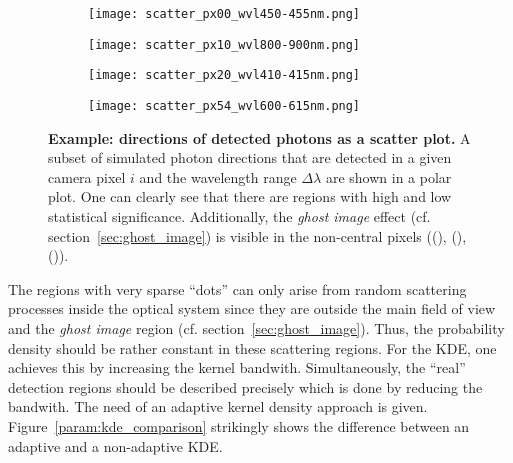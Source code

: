 \begin{figure}[H]
	\centering
	\begin{subfigure}[t]{0.49\textwidth}
		\texttt{[image: scatter\_px00\_wvl450-455nm.png]}
		\subcaption{}
		\label{param:example_scatter:1}
	\end{subfigure}
	\hfill
	\begin{subfigure}[t]{0.49\textwidth}
		\texttt{[image: scatter\_px10\_wvl800-900nm.png]}
		\subcaption{}
		\label{param:example_scatter:2}
	\end{subfigure}
	\vfill
	\begin{subfigure}[b]{0.49\textwidth}
		\texttt{[image: scatter\_px20\_wvl410-415nm.png]}
		\subcaption{}
		\label{param:example_scatter:3}
	\end{subfigure}
	\hfill
	\begin{subfigure}[b]{0.49\textwidth}
		\texttt{[image: scatter\_px54\_wvl600-615nm.png]}
		\subcaption{}
		\label{param:example_scatter:4}
	\end{subfigure}
	\caption[Example: directions of detected photons as a scatter plot]{\textbf{Example: directions of detected photons as a scatter plot.} A subset of simulated photon directions that are detected in a given camera pixel $i$ and the wavelength range $\Delta\lambda$ are shown in a polar plot. One can clearly see that there are regions with high and low statistical significance. Additionally, the \textit{ghost image} effect (cf. section~\ref{sec:ghost_image}) is visible in the non-central pixels ((), (), ()).}
	\label{param:example_scatter}	
\end{figure}

The regions with very sparse \enquote{dots} can only arise from random scattering processes inside the optical system since they are outside the main field of view and the \textit{ghost image} region (cf. section~\ref{sec:ghost_image}). Thus, the probability density should be rather constant in these scattering regions. For the KDE, one achieves this by increasing the kernel bandwith. Simultaneously, the \enquote{real} detection regions should be described precisely which is done by reducing the bandwith. The need of an adaptive kernel density approach is given. Figure~\ref{param:kde_comparison} strikingly shows the difference between an adaptive and a non-adaptive KDE.\\

